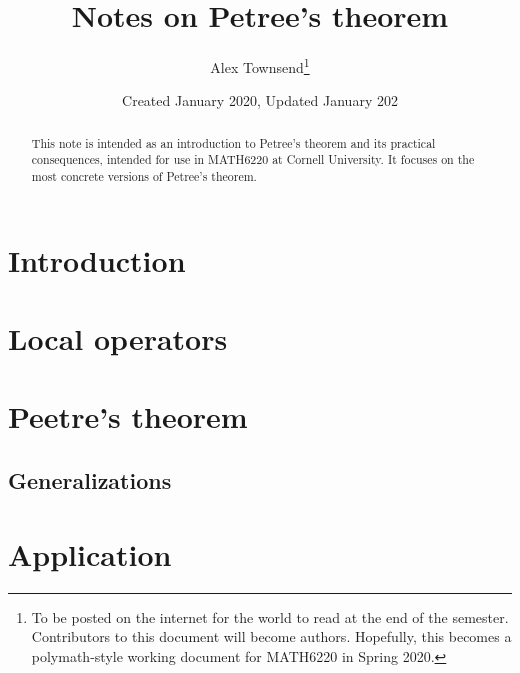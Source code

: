 \documentclass{article}
\title{Notes on Petree's theorem}
\author{Alex Townsend\footnote{To be posted on the internet for the world to read at the end of the semester. Contributors to this document will become authors. Hopefully, this becomes a polymath-style working document for MATH6220 in Spring 2020.}}
\date{Created January 2020, Updated January 202}
\begin{document}
\maketitle
\begin{abstract} 
This note is intended as an introduction to Petree's theorem and its practical consequences, intended for use in MATH6220 at Cornell University. It focuses on the most concrete versions of Petree's theorem. 
\end{abstract}

\tableofcontents

\section{Introduction} %

\section{Local operators} %

\section{Peetre's theorem} 

\subsection{Generalizations}

\section{Application} 
\end{document}
